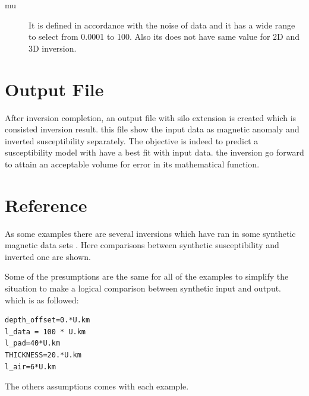 \begin{description} 	

\item[mu]
It is defined in accordance with the noise of data and it has a wide range to select from 0.0001 to 100. Also its does not have same value for 2D and 3D inversion.

\end{description}

\section{Output File}

After inversion completion, an output file with silo extension is created which is consisted inversion result. this file show the input data as magnetic anomaly and inverted susceptibility separately. The objective is indeed to  predict a susceptibility model with have a best fit with input data. the inversion go forward to attain an acceptable volume for error in its mathematical function. 


\section{Reference}

As some examples there are several inversions which have ran in some synthetic magnetic data sets . Here comparisons between synthetic susceptibility and inverted one are shown.

Some of the presumptions are the same for all of the examples to simplify the situation to make a logical comparison between synthetic input and output. which is as followed:

\begin{verbatim}
depth_offset=0.*U.km
l_data = 100 * U.km
l_pad=40*U.km
THICKNESS=20.*U.km
l_air=6*U.km
\end{verbatim}

The others assumptions comes with each example.

